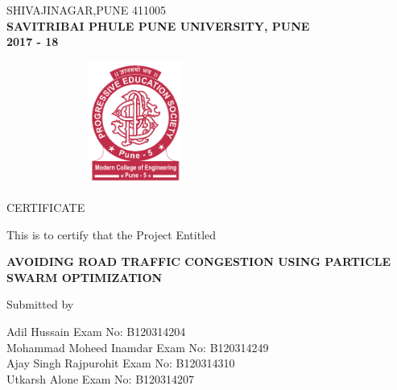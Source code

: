 \documentclass[twoside,a4paper,12pt]{book}
\begin{document}
\begin{center}
\fontsize{12}{12pt}\selectfont
SHIVAJINAGAR,PUNE 411005 \\[5mm]


\fontsize{14}{12pt}\selectfont
\textbf{SAVITRIBAI PHULE PUNE UNIVERSITY, PUNE}\\
\textbf{2017 - 18}     
\end{center}





\newpage

\begin{figure}[ht]
\centering
\includegraphics[height=1.6in, width=2.5in,keepaspectratio]{collegelogo.png}\\[6mm]
\end{figure}


{\bfseries \fontsize{16}{12} \selectfont \centerline{CERTIFICATE} 
\vspace*{2\baselineskip}} 

\centerline{This is to certify that the Project Entitled}
\vspace*{.5\baselineskip} 


{\bfseries \fontsize{16}{16} \selectfont \centering AVOIDING ROAD TRAFFIC CONGESTION USING PARTICLE SWARM OPTIMIZATION
\vspace*{0.5\baselineskip}}

\centerline{Submitted by}
\vspace*{0.5\baselineskip} 
\hspace*{15mm}Adil Hussain \hfill Exam No: B120314204\hspace*{15mm} \\
\hspace*{15mm}Mohammad Moheed Inamdar \hfill Exam No: B120314249\hspace*{15mm}  \\
\hspace*{15mm}Ajay Singh Rajpurohit \hfill Exam No: B120314310\hspace*{15mm} \\
\hspace*{15mm}Utkarsh Alone \hfill Exam No: B120314207\hspace*{15mm} \\
\vspace*{0.5\baselineskip}
\end{document}
